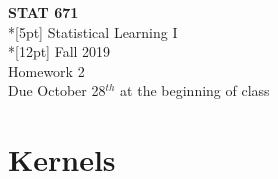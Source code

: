 \documentclass[11pt]{article}
\begin{document}
\thispagestyle{empty}
\vspace{10pt}
\begin{center}
{\large\bf STAT 671}    \\*[5pt] {\Large Statistical Learning I}
\\*[12pt] {\large Fall 2019}
\\ {\large Homework 2}
\\ {\large Due October 28$^{th}$ at the beginning of class}
\end{center}
\vspace{1cm}
\noindent


\section{Kernels}
\end{document}
